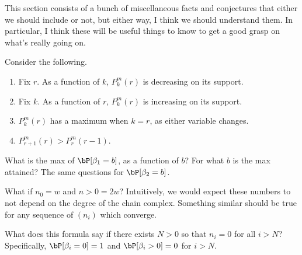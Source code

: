 
This section consists of a bunch of miscellaneous facts and conjectures that
either we should include or not, but either way, I think we should understand
them. In particular, I think these will be useful things to know to get a good
grasp on what's really going on. 

\begin{conjecture}
 Consider the following.
  \begin{enumerate}
    \item Fix $r$. As a function of $k$, $P^m_k(r)$ is decreasing on its support.
    \item Fix $k$. As a function of $r$, $P^m_k(r)$ is increasing on its support.
    \item $P^m_k(r)$ has a maximum when $k = r$, as either variable changes.
    \item $P^m_{r+1}(r) > P^m_r(r-1)$.
  \end{enumerate}
\end{conjecture}



\begin{question} 
  What is the max of $\bP[\beta_1=b]$, as a function of $b$? For
  what $b$ is the max attained? The same questions for $\bP[\beta_2=b]$.
\end{question}

\begin{question}
  What if $n_0 = w$ and $n>0 = 2w$? Intuitively, we would expect these numbers
  to not depend on the degree of the chain complex. Something similar should
  be true for any sequence of $(n_i)$ which converge.
\end{question}

\begin{question}
  What does this formula say if there exists $N >0$ so that $n_i=0$ for 
  all $i > N$? Specifically, $\bP[\beta_i=0] = 1$ and $\bP[\beta_i > 0]= 0$ 
  for $i>N$.
\end{question}

